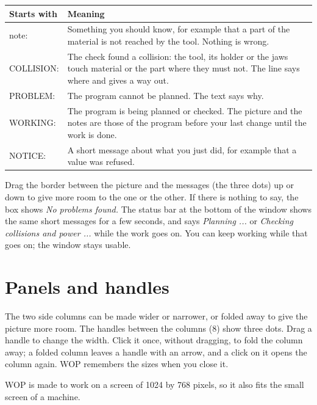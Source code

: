 \begin{center}
\begin{tabularx}{\textwidth}{@{}l Y@{}}
\toprule
\textbf{Starts with} & \textbf{Meaning} \\
\midrule
\textsf{note:} & Something you should know, for example that a part of the material is not reached by the tool. Nothing is wrong. \\
\textsf{COLLISION:} & The check found a collision: the tool, its holder or the jaws touch material or the part where they must not. The line says where and gives a way out. \\
\textsf{PROBLEM:} & The program cannot be planned. The text says why. \\
\textsf{WORKING:} & The program is being planned or checked. The picture and the notes are those of the program before your last change until the work is done. \\
\textsf{NOTICE:} & A short message about what you just did, for example that a value was refused. \\
\bottomrule
\end{tabularx}
\end{center}

Drag the border between the picture and the messages (the three dots) up or down to give more room to the one or the other. If there is nothing to say, the box shows \emph{No problems found.} The status bar at the bottom of the window shows the same short messages for a few seconds, and says \emph{Planning ...} or \emph{Checking collisions and power ...} while the work goes on. You can keep working while that goes on; the window stays usable.

\section{Panels and handles}\label{sec:window:handles}

The two side columns can be made wider or narrower, or folded away to give the picture more room. The handles between the columns (8) show three dots. Drag a handle to change the width. Click it once, without dragging, to fold the column away; a folded column leaves a handle with an arrow, and a click on it opens the column again. WOP remembers the sizes when you close it.

WOP is made to work on a screen of 1024 by 768 pixels, so it also fits the small screen of a machine.
